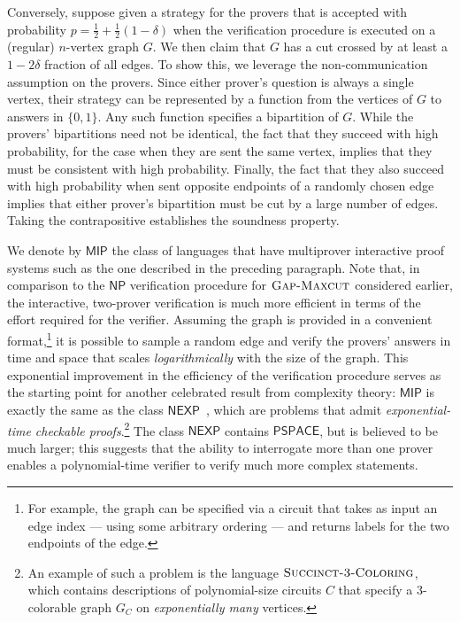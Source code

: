 \documentclass[11pt]{article}
\theoremstyle{definition}
\newcommand{\GX}{\textsc{Gap}\textsc{-}\penalty-1000\textsc{Maxcut}}
\newcommand{\class}[1]{\ensuremath{\mathsf{#1}}\xspace}
\newcommand{\NP}{\class{NP}} %
\newcommand{\NEXP}{\class{NEXP}} %
\newcommand{\PSPACE}{\class{PSPACE}} %
\newcommand{\MIP}{\class{MIP}} %
\begin{document}
Conversely, suppose given a strategy for the provers that is accepted with probability $p = \frac{1}{2} + \frac{1}{2}(1-\delta)$ when the verification procedure is executed on a (regular) $n$-vertex graph $G$. 
We then claim that $G$ has a cut crossed by at least a $1-2\delta$ fraction of all edges. To show this, we leverage the non-communication assumption on the provers. Since either prover's question is always a single vertex, their strategy can be represented by a function from the vertices of $G$ to answers in $\{0,1\}$. Any such function specifies a bipartition of $G$. While the provers'  bipartitions need not be identical, the fact that they succeed with high probability, for the case when they are sent the same vertex, implies that they must be consistent with high probability. Finally, the fact that they also succeed with high probability when sent opposite endpoints of a randomly chosen edge implies that either prover's bipartition must be cut by a large number of edges. Taking the contrapositive establishes the soundness property.

We denote by $\MIP$ the class of languages that have multiprover interactive proof systems such as the one described in the preceding paragraph. 
Note that, in comparison to the $\NP$ verification procedure for $\GX$ considered earlier, the interactive, two-prover verification is much more efficient in terms of the effort required for the verifier.
 Assuming the graph is provided in a convenient format,\footnote{For example, the graph can be specified via a circuit that takes as input an edge index --- using some arbitrary ordering --- and returns labels for the two endpoints of the edge.} it is possible to sample a random edge and verify the provers' answers in time and space that scales \emph{logarithmically} with the size of the graph. %
 This exponential improvement in the efficiency of the verification procedure serves as the starting point for another celebrated result from complexity theory: $\mathsf{MIP}$ is exactly the same as the class $\mathsf{NEXP}$~\cite{babai1991non}, which are problems that admit \emph{exponential-time checkable proofs}.\footnote{An example of such a problem is the language $\textsc{Succinct-3-Coloring}$, which contains descriptions of polynomial-size circuits $C$ that specify a $3$-colorable graph $G_C$ on \emph{exponentially many} vertices.} The class $\NEXP$ contains $\PSPACE$, but is believed to be much larger; this suggests that the ability to interrogate more than one prover enables a polynomial-time verifier to verify much more complex statements.
 
\end{document}
